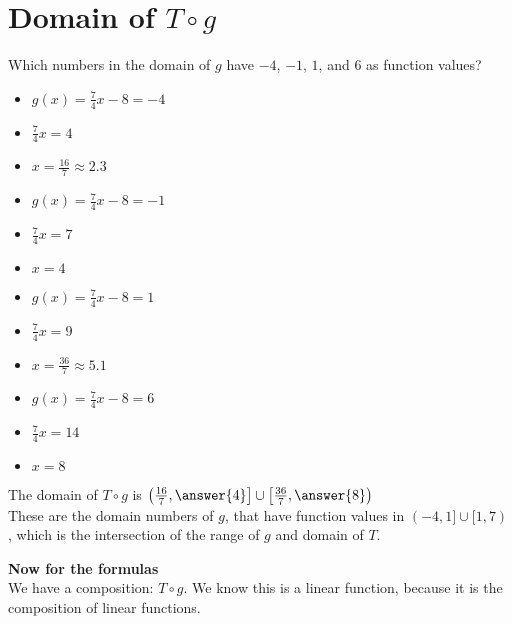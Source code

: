\documentclass{ximera}
\begin{document}
\section{Domain of $T \circ g$}

Which numbers in the domain of $g$ have $-4$, $-1$, $1$, and $6$ as function values? \\


\begin{itemize}
\item $g(x) = \frac{7}{4}x -8 = -4$
\item $\frac{7}{4}x = 4$
\item $x = \frac{16}{7} \approx 2.3$
\end{itemize}



\begin{itemize}
\item $g(x) = \frac{7}{4}x -8 = -1$
\item $\frac{7}{4}x = 7$
\item $x = 4$
\end{itemize}


\begin{itemize}
\item $g(x) = \frac{7}{4}x -8 = 1$
\item $\frac{7}{4}x = 9$
\item $x = \frac{36}{7} \approx 5.1$
\end{itemize}


\begin{itemize}
\item $g(x) = \frac{7}{4}x -8 = 6$
\item $\frac{7}{4}x = 14$
\item $x = 8$
\end{itemize}



The domain of $T \circ g$ is $\left( \frac{16}{7}, \answer{4} \right] \cup \left[ \frac{36}{7}, \answer{8} \right)$ \\


These are the domain numbers of $g$, that have function values in $(-4,1] \cup [1,7)$, which is the intersection of the range of $g$ and domain of $T$.



\textbf{Now for the formulas} \\


We have a composition: $T \circ g$.  We know this is a linear function, because it is the composition of linear functions. \\
\end{document}
